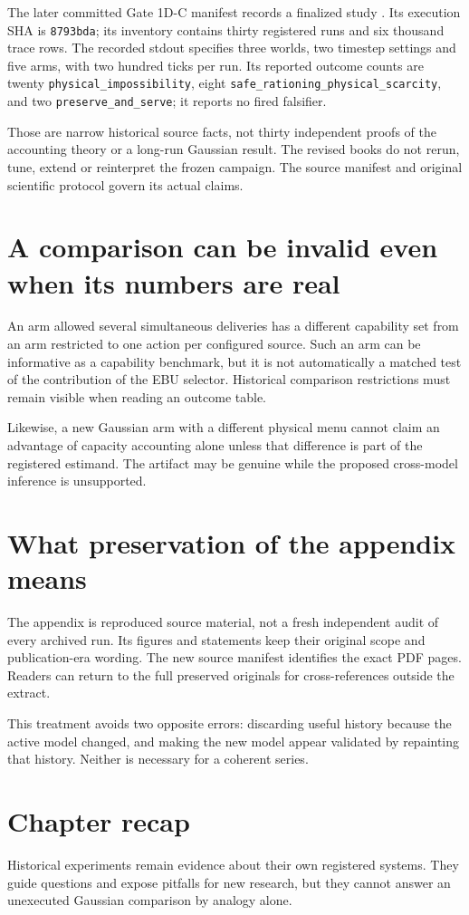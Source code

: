The later committed Gate 1D-C manifest records a finalized study
\cite{gate}. Its execution SHA is \texttt{8793bda}; its inventory contains
thirty registered runs and six thousand trace rows. The recorded stdout
specifies three worlds, two timestep settings and five arms, with two
hundred ticks per run. Its reported outcome counts are twenty
\texttt{physical\_impossibility}, eight
\texttt{safe\_rationing\_physical\_scarcity}, and two
\texttt{preserve\_and\_serve}; it reports no fired falsifier.

Those are narrow historical source facts, not thirty independent proofs
of the accounting theory or a long-run Gaussian result. The revised books
do not rerun, tune, extend or reinterpret the frozen campaign. The source
manifest and original scientific protocol govern its actual claims.

\section{A comparison can be invalid even when its numbers are real}
An arm allowed several simultaneous deliveries has a different capability
set from an arm restricted to one action per configured source. Such an
arm can be informative as a capability benchmark, but it is not automatically
a matched test of the contribution of the EBU selector. Historical
comparison restrictions must remain visible when reading an outcome table.

Likewise, a new Gaussian arm with a different physical menu cannot claim
an advantage of capacity accounting alone unless that difference is part
of the registered estimand. The artifact may be genuine while the proposed
cross-model inference is unsupported.

\section{What preservation of the appendix means}
The appendix is reproduced source material, not a fresh independent audit
of every archived run. Its figures and statements keep their original
scope and publication-era wording. The new source manifest identifies the
exact PDF pages. Readers can return to the full preserved originals for
cross-references outside the extract.

This treatment avoids two opposite errors: discarding useful history
because the active model changed, and making the new model appear validated
by repainting that history. Neither is necessary for a coherent series.

\section*{Chapter recap}
Historical experiments remain evidence about their own registered systems.
They guide questions and expose pitfalls for new research, but they cannot
answer an unexecuted Gaussian comparison by analogy alone.
